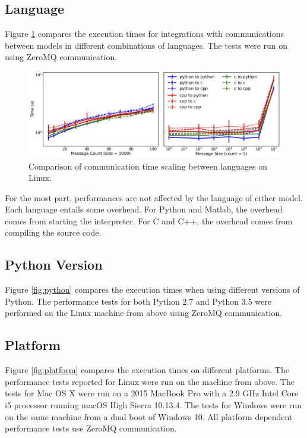 \documentclass[journal]{IEEEtran}
\newcommand{\todo}[1]{{\color{red}{#1}}}
\begin{document}
\subsection{Language}
%
Figure \ref{fig:language} compares the execution times for integrations with communications between models in different combinations of languages. The tests were run on \todo{the Linux machine from above} using ZeroMQ communication.
%
\ifinclfig
 	\begin{figure}[htbp]
	\begin{center}
	\includegraphics[width=\columnwidth,keepaspectratio]{./images/scaling_language.png}
	\caption{Comparison of communication time scaling between languages on Linux.}
	\label{fig:language}
	\end{center}
	\end{figure}
\fi
%
For the most part, performances are not affected by the language of either model. Each language entails some overhead. For Python and Matlab, the overhead comes from starting the interpreter. For C and C++, the overhead comes from compiling the source code.
%
\todo{results for Matlab}

\subsection{Python Version}
%
Figure \ref{fig:python} compares the execution times when using different versions of Python. The performance tests for both Python 2.7 and Python 3.5 were performed on the Linux machine from above using ZeroMQ communication.
%
\todo{figure and results}

\subsection{Platform}
%
Figure \ref{fig:platform} compares the execution times on different platforms. The performance tests reported for Linux were run on the machine from above. The tests for Mac OS X were run on a 2015 MacBook Pro with a 2.9 GHz Intel Core i5 processor running macOS High Sierra 10.13.4. The tests for Windows were run on the same machine from a dual boot of Windows 10. All platform dependent performance tests use ZeroMQ communication.
%
\todo{figure and results}
\end{document}
